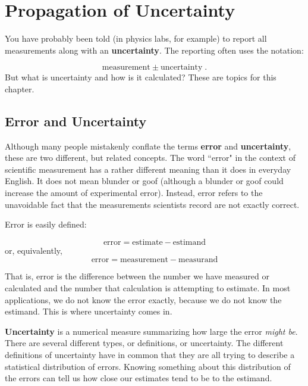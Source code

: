 \documentclass[twoside]{book}\usepackage[]{graphicx}\usepackage[]{xcolor}
\def\myindex#1{\index{#1}}
\def\term#1{\textbf{#1}}
\newlength{\tempfmlength}
\newenvironment{fmpage}[1]
     {
	 \medskip
	 \setlength{\tempfmlength}{#1}
	 \begin{lrbox}{\fmbox}
	   \begin{minipage}{#1}
		 \vspace*{.02\tempfmlength}
		 \hfill
	   \begin{minipage}{.95 \tempfmlength}}
		 {\end{minipage}\hfill
		 \vspace*{.015\tempfmlength}
		 \end{minipage}\end{lrbox}\fbox{\usebox{\fmbox}}
	 \medskip
	 }
\newenvironment{boxedText}[1][.98\textwidth]%
{%
\begin{center}
\begin{fmpage}{#1}
}%
{%
\end{fmpage}
\end{center}
}
\newcounter{example}[section]
\newif\ifsolutions
\newif\ifsolutionslocal
\begin{document}
\shipoutProblems

\ifsolutions
\ifsolutionslocal
\newpage
\section*{Solutions}
\shipoutSolutions
\fi
\fi
 
% 


\chapter{Propagation of Uncertainty}
\label{chap:propagation}%

\myindex{uncertainty|defidx}
You have probably been told (in physics labs, for example) to report all measurements
along with an \term{uncertainty}.  The reporting often uses the notation:

\[ \mbox{measurement} \pm \mbox{uncertainty} \;. \]
%
But what is uncertainty and how is it calculated?  These are topics for this chapter.

\section{Error and Uncertainty}
Although many people mistakenly conflate the terms \term{error} and \term{uncertainty}, 
these are two different, but related concepts.  
The word ``error" in the context of scientific measurement has a rather
different meaning than it does in everyday English. It does not mean blunder or
goof (although a blunder or goof could increase the amount of experimental error). 
Instead, error refers to the unavoidable fact that
the measurements scientists record are not exactly correct.


Error is easily defined:

\begin{boxedText}
	\[ \mbox{error} = \mbox{estimate} - \mbox{estimand} \]
or, equivalently,
	\[ \mbox{error} = \mbox{measurement} - \mbox{measurand} \]
\end{boxedText}
That is, error is the difference between the number we have measured or calculated and the 
number that calculation is attempting to estimate.  In most applications, we do not know 
the error exactly, because we do not know the estimand.  This is where uncertainty comes in.

\term{Uncertainty} is a numerical measure summarizing how large the error \emph{might be}.  There are several different types, or definitions, or uncertainty.  The different definitions of uncertainty have in common that they are all trying to describe a statistical distribution of errors.  
Knowing something about this distribution
of the errors can tell us how close our estimates tend to be to the estimand.
\end{document}
